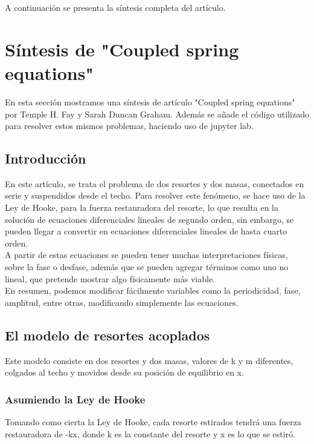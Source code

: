 \documentclass[12pt]{article}
\begin{document}
A continuación se presenta la síntesis completa del artículo. 

\section{Síntesis de "Coupled spring equations"}

En esta sección mostramos una síntesis de artículo "Coupled spring equations" por Temple H. Fay y Sarah Duncan Graham. Además se añade el código utilizado para resolver estos mismos problemas, haciendo uso de jupyter lab.

\subsection{Introducción}
En este artículo, se trata el problema de dos resortes y dos masas, conectados en serie y suspendidos desde el techo. Para resolver este fenómeno, se hace uso de la Ley de Hooke, para la fuerza restauradora del resorte, lo que resulta en la solución de ecuaciones diferenciales lineales de segundo orden, sin embargo, se pueden llegar a convertir en ecuaciones diferenciales lineales de hasta cuarto orden.\\ 

A partir de estas ecuaciones se pueden tener muchas interpretaciones físicas, sobre la fase o desfase, además que se pueden agregar términos como uno no lineal, que pretende mostrar algo físicamente más viable. \\

En resumen, podemos modificar fácilmente variables como la periodicidad, fase, amplitud, entre otras, modificando simplemente las ecuaciones.

\subsection{El modelo de resortes acoplados}

Este modelo consiste en dos resortes y dos masas, valores de k y m diferentes, colgados al techo y movidos desde su posición de equilibrio en x. 

\subsubsection{Asumiendo la Ley de Hooke}

Tomando como cierta la Ley de Hooke, cada resorte estirados tendrá una fuerza restauradora de -kx, donde k es la constante del resorte y x es lo que se estiró. 
\end{document}
